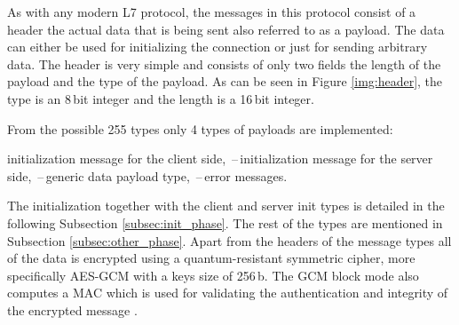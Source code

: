 As with any modern L7 protocol, the messages in this protocol consist of a header the actual data that is being sent also referred to as a payload. The data can either be used for initializing the connection or just for sending arbitrary data. The header is very simple and consists of only two fields the length of the payload and the type of the payload. As can be seen in Figure \ref{img:header}, the type is an 8\,bit integer and the length is a 16\,bit integer.

\noindent From the possible 255 types only 4 types of payloads are implemented:
\begin{itemize}
  initialization message for the client side,
  \,--\,initialization message for the server side,
  \,--\,generic data payload type,
  \,--\,error messages.
\end{itemize}
The initialization together with the client and server init types is detailed in the following Subsection \ref{subsec:init_phase}. The rest of the types are mentioned in Subsection \ref{subsec:other_phase}. Apart from the headers of the message types all of the data is encrypted using a quantum-resistant symmetric cipher, more specifically AES-GCM with a keys size of 256\,b. The GCM block mode also computes a MAC which is used for validating the authentication and integrity of the encrypted message \cite{Paar2010}.
